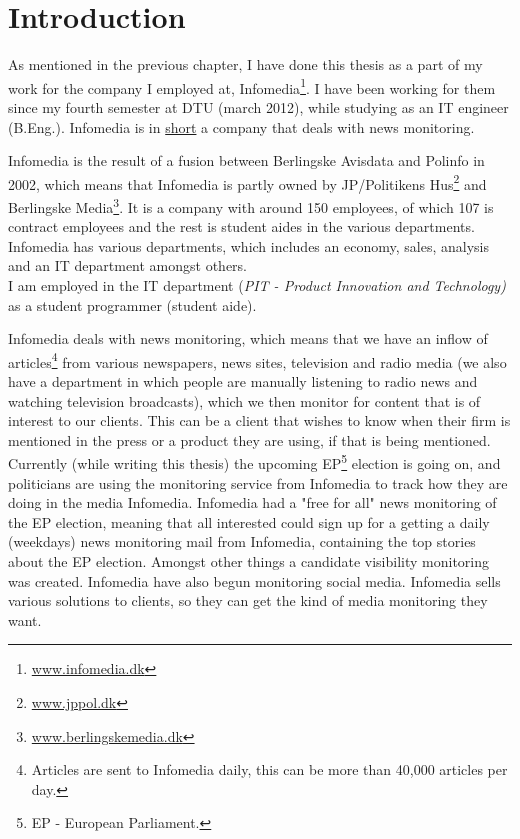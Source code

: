 \chapter{Introduction}
As mentioned in the previous chapter, I have done this thesis as a part of my work for the company I employed at, Infomedia\footnote{\url{www.infomedia.dk}}. I have been working for them since my fourth semester at DTU (march 2012), while studying as an IT engineer (B.Eng.). Infomedia is in \underline{short} a company that deals with news monitoring.

Infomedia is the result of a fusion between Berlingske Avisdata and Polinfo in 2002, which means that Infomedia is partly owned by JP/Politikens Hus\footnote{\url{www.jppol.dk}} and Berlingske Media\footnote{\url{www.berlingskemedia.dk}}. It is a company with around 150 employees, of which 107 is contract employees and the rest is student aides in the various departments. Infomedia has various departments, which includes an economy, sales, analysis and an IT department amongst others.\\
I am employed in the IT department (\textit{PIT - Product Innovation and Technology)} as a student programmer (student aide).

Infomedia deals with news monitoring, which means that we have an inflow of articles\footnote{Articles are sent to Infomedia daily, this can be more than 40,000 articles per day.} from various newspapers, news sites, television and radio media (we also have a department in which people are manually listening to radio news and watching television broadcasts), which we then monitor for content that is of interest to our clients.  This can be a client that wishes to know when their firm is mentioned in the press or a product they are using, if that is being mentioned. 
Currently (while writing this thesis) the upcoming EP\footnote{EP - European Parliament.} election is going on, and politicians are using the monitoring service from Infomedia to track how they are doing in the media Infomedia\cite{EuropaValg}. Infomedia had a "free for all" news monitoring of the EP election, meaning that all interested could sign up for a getting a daily (weekdays) news monitoring mail from Infomedia, containing the top stories about the EP election. Amongst other things a candidate visibility monitoring was created\cite{InfomediaEpKandidater}. Infomedia have also begun monitoring social media. Infomedia sells various solutions to clients, so they can get the kind of media monitoring they want.

